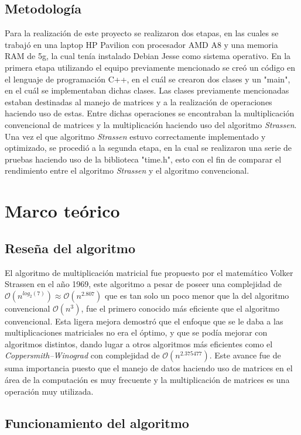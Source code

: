 \documentclass[12pt,letterpaper]{article}
\begin{document}
\subsection{Metodología}
Para la realización de este proyecto se realizaron dos etapas, en las cuales se trabajó en una laptop HP Pavilion con procesador AMD A8 y una memoria RAM de 5g, la cual tenía instalado Debian Jesse como sistema operativo. 
En la primera etapa utilizando el equipo previamente mencionado se creó un código en el lenguaje de programación C++, en el cuál se crearon dos clases y un "main", en el cuál se implementaban dichas clases. Las clases previamente mencionadas estaban destinadas al manejo de matrices y a la realización de operaciones haciendo uso de estas. Entre dichas operaciones se encontraban la multiplicación convencional de matrices y la multiplicación haciendo uso del algoritmo \textit{Strassen}.
Una vez el que algoritmo \textit{Strassen} estuvo correctamente implementado y optimizado, se procedió a la segunda etapa, en la cual se realizaron una serie de pruebas haciendo uso de la biblioteca "time.h", esto con el fin de comparar el rendimiento entre el algoritmo \textit{Strassen} y el algoritmo convencional.


\section{Marco teórico}
\subsection{Reseña del algoritmo}
El algoritmo de multiplicación matricial fue propuesto por el matemático Volker Strassen en el año 1969, este algoritmo a pesar de poseer una complejidad de $\mathcal{O}(n^{log_{2}(7)})\approx \mathcal{O}(n^{2.807})$ que es tan solo un poco menor que la del algoritmo convencional $\mathcal{O}(n^3)$, fue el primero conocido más eficiente que el algoritmo convencional. Esta ligera mejora demostró que el enfoque que se le daba a las multiplicaciones matriciales no era el óptimo, y que se podía mejorar con algoritmos distintos, dando lugar a otros algoritmos más eficientes como el \textit{Coppersmith–Winograd} con complejidad de $\mathcal{O}(n^{2.375477})$. Este avance fue de suma importancia puesto que el manejo de datos haciendo uso de matrices en el área de la computación es muy frecuente y la multiplicación de matrices es una operación muy utilizada.

\subsection{Funcionamiento del algoritmo}
\end{document}
